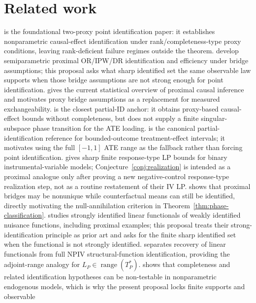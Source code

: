 \documentclass[11pt]{article}
\theoremstyle{definition}
\theoremstyle{plain}
\theoremstyle{remark}
\begin{document}
\section{Related work}
\citet{MiaoGengTchetgen2018Biometrika} is the foundational two-proxy point
identification paper: it establishes nonparametric causal-effect
identification under rank/completeness-type proxy conditions, leaving
rank-deficient failure regimes outside the theorem.  \citet{CuiPuShiMiaoTchetgen2024JASA}
develop semiparametric proximal OR/IPW/DR identification and efficiency under
bridge assumptions; this proposal asks what sharp identified set the same
observable law supports when those bridge assumptions are not strong enough
for point identification.  \citet{TchetgenYingCuiShiMiao2024StatSci} gives
the current statistical overview of proximal causal inference and motivates
proxy bridge assumptions as a replacement for measured exchangeability.
\citet{GhassamiShpitserTchetgen2023ProxyPI} is the closest partial-ID anchor:
it obtains proxy-based causal-effect bounds without completeness, but does
not supply a finite singular-subspace phase transition for the ATE loading.
\citet{Manski1990AER} is the canonical partial-identification reference for
bounded-outcome treatment-effect intervals; it motivates using the full
\([-1,1]\) ATE range as the fallback rather than forcing point identification.
\citet{BalkePearl1997JASA} gives sharp finite response-type LP bounds for
binary instrumental-variable models; Conjecture~\ref{conj:realization} is
intended as a proximal analogue only after proving a new negative-control
response-type realization step, not as a routine restatement of their IV LP.
\citet{ZhangLiMiaoTchetgen2023SPL} shows that proximal bridges may be
nonunique while counterfactual means can still be identified, directly
motivating the null-annihilation criterion in
Theorem~\ref{thm:phase-classification}.
\citet{BennettKallusMaoNeweySyrgkanisUehara2023COLT} studies strongly
identified linear functionals of weakly identified nuisance functions,
including proximal examples; this proposal treats their strong-identification
principle as prior art and asks for the finite sharp identified set when the
functional is not strongly identified.  \citet{Santos2011JoE}
separates recovery of linear functionals from full NPIV structural-function
identification, providing the adjoint-range analogy for \(L_P\in\operatorname{range}(T_P^*)\).
\citet{CanaySantosShaikh2013Econometrica} shows that completeness and related
identification hypotheses can be non-testable in nonparametric endogenous
models, which is why the present proposal locks finite supports and observable
\end{document}
